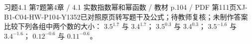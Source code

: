 \par\noindent\begin{minipage}{\linewidth}
\begin{bankitem}{习题4.1 第7题}{第4章 / 4.1 实数指数幂和幂函数 / 教材 p.104 / PDF 第111页}{XJ-B1-C04-HW-P104-Y1352}{已对照原页转写题干及公式；待教师复核；未制作答案}
比较下列各组中两个数的大小：
$3.5^{1.7}$ 与 $3.4^{1.7}$；
$3.5^{0.3}$ 与 $3.4^{0.3}$；
$3.5^{-1.6}$ 与 $3.4^{-1.6}$；
$0.12^{-0.6}$ 与 $0.11^{-0.6}$。
\end{bankitem}
\end{minipage}\par\medskip
